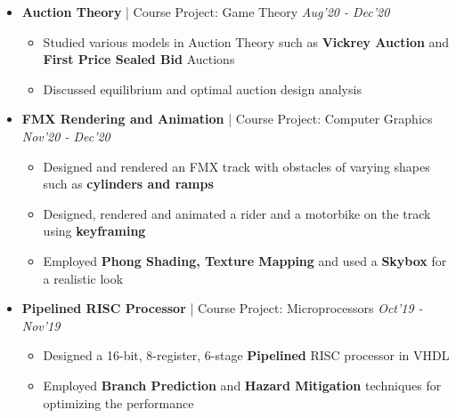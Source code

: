 \documentclass[10pt,letterpaper,sans]{moderncv}
\providecommand{\sl}{\slshape}
\begin{document}
\begin{itemize}
\vspace{-10pt}
\begin{itemize}
\item Used \textbf{Mean Shift Segmentation} across both time and spatial dimensions for toonification of videos
\item Benchmarked results with standard techniques such as Bilateral Filtering
\end{itemize}
\vspace{5pt}
\item \textbf{Auction Theory} | Course Project: Game Theory \hfill{\sl Aug'20 - Dec'20}\\
\vspace{-10pt}
\begin{itemize}
\item Studied various models in Auction Theory such as \textbf{Vickrey Auction} and \textbf{First Price Sealed Bid} Auctions
\item Discussed equilibrium and optimal auction design analysis
\end{itemize}
\vspace{5pt}
\item \textbf{FMX Rendering and Animation} | Course Project: Computer Graphics \hfill{\sl Nov'20 - Dec'20}\\
\vspace{-10pt}
\begin{itemize}
\item Designed and rendered an FMX track with obstacles of varying shapes such as \textbf{cylinders and ramps}
\item Designed, rendered and animated a rider and a motorbike on the track using \textbf{keyframing}
\item Employed \textbf{Phong Shading, Texture Mapping} and used a \textbf{Skybox} for a realistic look
\end{itemize}
\vspace{5pt}
\item \textbf{Pipelined RISC Processor} | Course Project: Microprocessors \hfill{\sl Oct'19 - Nov'19}\\
\vspace{-10pt}
\begin{itemize}
\item Designed a 16-bit, 8-register, 6-stage \textbf{Pipelined} RISC processor in VHDL
\item Employed \textbf{Branch Prediction} and \textbf{Hazard Mitigation} techniques for optimizing the performance

\end{itemize}
\end{itemize}
\end{document}
